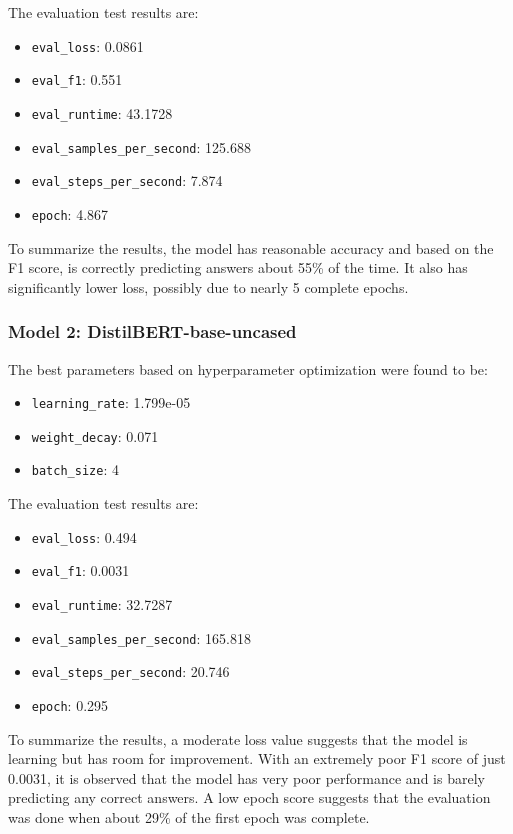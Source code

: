 \documentclass[titlepage]{article}
\begin{document}
The evaluation test results are:
\begin{itemize}
    \item \texttt{eval\_loss}: 0.0861
    \item \texttt{eval\_f1}: 0.551
    \item \texttt{eval\_runtime}: 43.1728
    \item \texttt{eval\_samples\_per\_second}: 125.688
    \item \texttt{eval\_steps\_per\_second}: 7.874
    \item \texttt{epoch}: 4.867
\end{itemize}

To summarize the results, the model has reasonable accuracy and based on the F1 score, is correctly predicting 
answers about 55\% of the time. It also has significantly lower loss, possibly due to nearly 5 complete epochs.


\subsubsection{Model 2: DistilBERT-base-uncased}
The best parameters based on hyperparameter optimization were found to be:
\begin{itemize}
    \item \texttt{learning\_rate}: 1.799e-05
    \item \texttt{weight\_decay}: 0.071
    \item \texttt{batch\_size}: 4
\end{itemize}

The evaluation test results are:
\begin{itemize}
    \item \texttt{eval\_loss}: 0.494
    \item \texttt{eval\_f1}: 0.0031
    \item \texttt{eval\_runtime}: 32.7287
    \item \texttt{eval\_samples\_per\_second}: 165.818
    \item \texttt{eval\_steps\_per\_second}: 20.746
    \item \texttt{epoch}: 0.295
\end{itemize}

To summarize the results, a moderate loss value suggests that the model is learning but has room 
for improvement. With an extremely poor F1 score of just 0.0031, it is observed that the model has very 
poor performance and is barely predicting any correct answers. A low epoch score suggests that the evaluation 
was done when about 29\% of the first epoch was complete.
\end{document}
